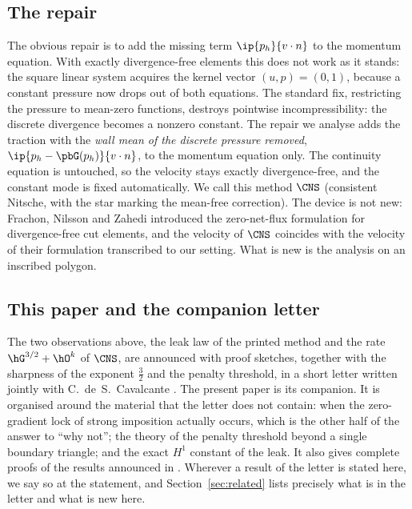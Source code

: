 \subsection{The repair}
The obvious repair is to add the missing term $\ip{p_h}{v\cdot n}$ to the momentum equation. With exactly divergence-free elements this does not work as it stands: the square linear system acquires the kernel vector $(u,p)=(0,1)$, because a constant pressure now drops out of both equations. The standard fix, restricting the pressure to mean-zero functions, destroys pointwise incompressibility: the discrete divergence becomes a nonzero constant. The repair we analyse adds the traction with the \emph{wall mean of the discrete pressure removed}, $\ip{p_h-\pbG(p_h)}{v\cdot n}$, to the momentum equation only. The continuity equation is untouched, so the velocity stays exactly divergence-free, and the constant mode is fixed automatically. We call this method $\CNS$ (consistent Nitsche, with the star marking the mean-free correction). The device is not new: Frachon, Nilsson and Zahedi \cite{FrachonNilssonZahedi2024} introduced the zero-net-flux formulation for divergence-free cut elements, and the velocity of $\CNS$ coincides with the velocity of their formulation transcribed to our setting. What is new is the analysis on an inscribed polygon.

\subsection{This paper and the companion letter}\label{sec:companion}
The two observations above, the leak law of the printed method and the rate $\hG^{3/2}+\hO^k$ of $\CNS$, are announced with proof sketches, together with the sharpness of the exponent $\frac32$ and the penalty threshold, in a short letter written jointly with C.~de~S.~Cavalcante \cite{CavalcantePadhiLetter}. The present paper is its companion. It is organised around the material that the letter does not contain: when the zero-gradient lock of strong imposition actually occurs, which is the other half of the answer to ``why not''; the theory of the penalty threshold beyond a single boundary triangle; and the exact $H^1$ constant of the leak. It also gives complete proofs of the results announced in \cite{CavalcantePadhiLetter}. Wherever a result of the letter is stated here, we say so at the statement, and Section~\ref{sec:related} lists precisely what is in the letter and what is new here.


